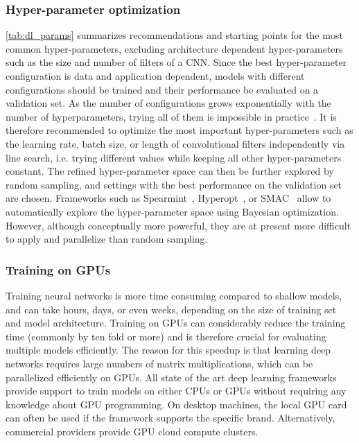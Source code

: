 \subsubsection{Hyper-parameter optimization}
\autoref{tab:dl_params} summarizes recommendations and starting points for the most common hyper-parameters, excluding architecture dependent hyper-parameters such as the size and number of filters of a CNN. Since the best hyper-parameter configuration is data and application dependent, models with different configurations should be trained and their performance be evaluated on a validation set. As the number of configurations grows exponentially with the number of hyperparameters, trying all of them is impossible in practice~\citep{bengio_practical_2012}. It is therefore recommended to optimize the most important hyper-parameters such as the learning rate, batch size, or length of convolutional filters independently via line search, i.e. trying different values while keeping all other hyper-parameters constant. The refined hyper-parameter space can then be further explored by random sampling, and settings with the best performance on the validation set are chosen. Frameworks such as Spearmint~\citep{snoek_practical_2012}, Hyperopt~\citep{bergstra_hyperparameter_2013}, or SMAC~\citep{hutter_sequential_2011} allow to automatically explore the hyper-parameter space using Bayesian optimization. However, although conceptually more powerful, they are at present more difficult to apply and parallelize than random sampling.

\subsubsection{Training on GPUs}
Training neural networks is more time consuming compared to shallow models, and can take hours, days, or even weeks, depending on the size of training set and model architecture. Training on GPUs can considerably reduce the training time (commonly by ten fold or more) and is therefore crucial for evaluating multiple models efficiently. The reason for this speedup is that learning deep networks requires large numbers of matrix multiplications, which can be parallelized efficiently on GPUs. All state of the art deep learning frameworks provide support to train models on either CPUs or GPUs without requiring any knowledge about GPU programming. On desktop machines, the local GPU card can often be used if the framework supports the specific brand. Alternatively, commercial providers provide GPU cloud compute clusters.


